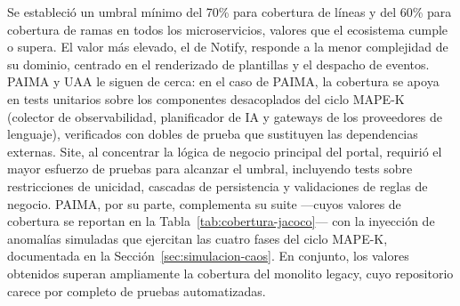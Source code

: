 Se estableció un umbral mínimo del 70\% para cobertura de líneas y del 60\% para
cobertura de ramas en todos los
microservicios, valores que el ecosistema cumple o supera. El valor más elevado,
el de Notify, responde a la menor complejidad de su dominio, centrado en el
renderizado de plantillas y el despacho de eventos. PAIMA y UAA le siguen de
cerca: en el caso de PAIMA, la cobertura se apoya en tests unitarios sobre los
componentes desacoplados del ciclo MAPE-K (colector de observabilidad, planificador
de IA y gateways de los proveedores de lenguaje), verificados con dobles de
prueba que sustituyen las dependencias externas. Site, al concentrar la lógica
de negocio principal del portal, requirió el mayor esfuerzo de pruebas para
alcanzar el umbral, incluyendo tests sobre restricciones de unicidad, cascadas
de persistencia y validaciones de reglas de negocio. PAIMA, por su parte,
complementa su suite ---cuyos valores de cobertura se reportan en la
Tabla~\ref{tab:cobertura-jacoco}--- con la inyección de anomalías
simuladas que ejercitan las cuatro fases del ciclo MAPE-K, documentada en la
Sección~\ref{sec:simulacion-caos}. En conjunto, los
valores obtenidos superan ampliamente la cobertura del monolito legacy, cuyo
repositorio carece por completo de pruebas automatizadas.

